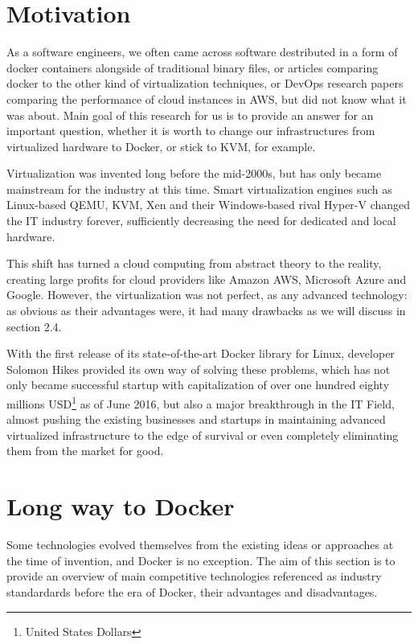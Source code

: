 
\section{Motivation}

As a software engineers,
we often came across software destributed
in a form of docker containers alongside
of traditional binary files,
or articles comparing docker to the other kind of virtualization techniques,
or DevOps research papers comparing the performance of cloud instances in AWS,
but did not know what it was about.
Main goal of this research for us is to provide an answer
for an important question, whether it is worth
to change our infrastructures
from virtualized hardware to Docker, or stick to KVM, for example.

Virtualization was invented long before the mid-2000s,
but has only became mainstream for the industry at this time.
Smart virtualization engines such as Linux-based QEMU, KVM, Xen
and their Windows-based rival Hyper-V changed the IT industry forever,
sufficiently decreasing the need for dedicated and local hardware.

This shift has turned a cloud computing from abstract theory to the reality,
creating large profits for cloud providers like Amazon AWS,
Microsoft Azure and Google.
However, the virtualization was not perfect, as any advanced technology:
as obvious as their advantages were, it had many
drawbacks as we will discuss in section 2.4.

With the first release of its state-of-the-art Docker library for Linux,
developer Solomon Hikes provided its own way of solving these problems,
which has not only became successful startup
with capitalization of over one hundred eighty millions
USD\footnote{United States Dollars} as of June 2016\cite{DockerCapitalization},
but also a major breakthrough in the IT Field, almost pushing the existing
businesses and startups in maintaining advanced virtualized infrastructure
to the edge of survival or even completely eliminating
them from the market for good\cite{DockerImpact}.

\section{Long way to Docker}

Some technologies evolved themselves from the existing ideas
or approaches at the time of invention, and Docker is no exception.
The aim of this section is to provide an overview of main competitive
technologies referenced as industry standardards
before the era of Docker, their advantages and disadvantages.

